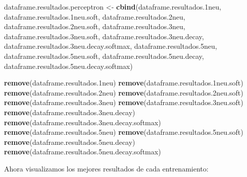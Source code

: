 \documentclass[]{article}
\newenvironment{Shaded}{\begin{snugshade}}{\end{snugshade}}
\newcommand{\KeywordTok}[1]{\textcolor[rgb]{0.13,0.29,0.53}{\textbf{#1}}}
\newcommand{\DataTypeTok}[1]{\textcolor[rgb]{0.13,0.29,0.53}{#1}}
\newcommand{\DecValTok}[1]{\textcolor[rgb]{0.00,0.00,0.81}{#1}}
\newcommand{\StringTok}[1]{\textcolor[rgb]{0.31,0.60,0.02}{#1}}
\newcommand{\OperatorTok}[1]{\textcolor[rgb]{0.81,0.36,0.00}{\textbf{#1}}}
\newcommand{\NormalTok}[1]{#1}
\begin{document}
\begin{Shaded}
\begin{Highlighting}[]
\NormalTok{dataframe.resultados.perceptron <-}\StringTok{ }\KeywordTok{cbind}\NormalTok{(dataframe.resultados.1neu,}
\NormalTok{                                         dataframe.resultados.1neu.soft,}
\NormalTok{                                         dataframe.resultados.2neu,}
\NormalTok{                                         dataframe.resultados.2neu.soft,}
\NormalTok{                                         dataframe.resultados.3neu,}
\NormalTok{                                         dataframe.resultados.3neu.soft,}
\NormalTok{                                         dataframe.resultados.3neu.decay,}
\NormalTok{                                         dataframe.resultados.3neu.decay.softmax,}
\NormalTok{                                         dataframe.resultados.5neu,}
\NormalTok{                                         dataframe.resultados.5neu.soft,}
\NormalTok{                                         dataframe.resultados.5neu.decay,}
\NormalTok{                                         dataframe.resultados.5neu.decay.softmax)}

\KeywordTok{remove}\NormalTok{(dataframe.resultados.1neu)}
\KeywordTok{remove}\NormalTok{(dataframe.resultados.1neu.soft)}
\KeywordTok{remove}\NormalTok{(dataframe.resultados.2neu)}
\KeywordTok{remove}\NormalTok{(dataframe.resultados.2neu.soft)}
\KeywordTok{remove}\NormalTok{(dataframe.resultados.3neu)}
\KeywordTok{remove}\NormalTok{(dataframe.resultados.3neu.soft)}
\KeywordTok{remove}\NormalTok{(dataframe.resultados.3neu.decay)}
\KeywordTok{remove}\NormalTok{(dataframe.resultados.3neu.decay.softmax)}
\KeywordTok{remove}\NormalTok{(dataframe.resultados.5neu)}
\KeywordTok{remove}\NormalTok{(dataframe.resultados.5neu.soft)}
\KeywordTok{remove}\NormalTok{(dataframe.resultados.5neu.decay)}
\KeywordTok{remove}\NormalTok{(dataframe.resultados.5neu.decay.softmax)}
\end{Highlighting}
\end{Shaded}

Ahora visualizamos los mejores resultados de cada entrenamiento:

\begin{Shaded}
\end{Shaded}
\end{document}
